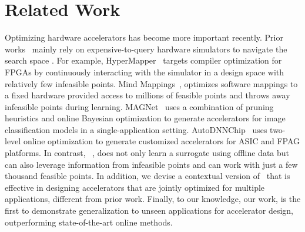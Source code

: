 \section{Related Work}
\label{sec:related}
%
Optimizing hardware accelerators has become more important recently. Prior works~\citep{bo:frontiers:2020,flexibo:arxiv:2020,cnn_gen:cyber:2020,prac_dse:mascots:2019,accel_gen:dac:2018,spatial:pldi:2018,automomml:hpc:2016,opentuner:pact:2014,hegdemind,magnet,autodnnchip} mainly rely on expensive-to-query hardware simulators to navigate the search space .
%
For example, HyperMapper~\citep{prac_dse:mascots:2019} targets compiler optimization for FPGAs by continuously interacting with the simulator in a design space with relatively few infeasible points.
%
Mind Mappings~\citep{hegdemind}, optimizes software mappings to a fixed hardware provided access to millions of feasible points and throws away infeasible points during learning.
%
%
{MAGNet~\citep{magnet} uses a combination of pruning heuristics and online Bayesian optimization to generate accelerators for image classification models in a single-application setting.}
%
{AutoDNNChip~\citep{autodnnchip} uses two-level online optimization to generate customized  accelerators for ASIC and FPAG platforms.}
%
In contrast, \primemethodname~, does not only learn a surrogate using offline data but can also leverage information from infeasible points and can work with just a few thousand feasible points.
%
{In addition, we devise a contextual version of \primemethodname\ that is effective in designing accelerators that are jointly optimized for multiple applications, different from prior work.}
%
Finally, to our knowledge, our work, is the first to demonstrate generalization to unseen applications for accelerator design, outperforming state-of-the-art online methods.

